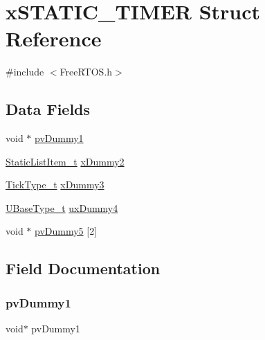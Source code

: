 \hypertarget{structx_s_t_a_t_i_c___t_i_m_e_r}{}\section{x\+S\+T\+A\+T\+I\+C\+\_\+\+T\+I\+M\+ER Struct Reference}
\label{structx_s_t_a_t_i_c___t_i_m_e_r}


{\ttfamily \#include $<$Free\+R\+T\+O\+S.\+h$>$}

\subsection*{Data Fields}
\begin{DoxyCompactItemize}
\item 
void $\ast$ \mbox{\hyperlink{structx_s_t_a_t_i_c___t_i_m_e_r_a6d34686c479f85ca81b1c8b8d63de30f}{pv\+Dummy1}}
\item 
\mbox{\hyperlink{_free_r_t_o_s_8h_a1d31bc0472385a87424518da484d9e09}{Static\+List\+Item\+\_\+t}} \mbox{\hyperlink{structx_s_t_a_t_i_c___t_i_m_e_r_af110422a11e634c23400ce5d10bd8b7f}{x\+Dummy2}}
\item 
\mbox{\hyperlink{portmacro_8h_aa69c48c6e902ce54f70886e6573c92a9}{Tick\+Type\+\_\+t}} \mbox{\hyperlink{structx_s_t_a_t_i_c___t_i_m_e_r_ac1b972afc468f0e753a25442242e6137}{x\+Dummy3}}
\item 
\mbox{\hyperlink{portmacro_8h_a646f89d4298e4f5afd522202b11cb2e6}{U\+Base\+Type\+\_\+t}} \mbox{\hyperlink{structx_s_t_a_t_i_c___t_i_m_e_r_a26be05b0990c51a2754226b559ab6550}{ux\+Dummy4}}
\item 
void $\ast$ \mbox{\hyperlink{structx_s_t_a_t_i_c___t_i_m_e_r_abae37cf280ed6295ec4169577ad19250}{pv\+Dummy5}} \mbox{[}2\mbox{]}
\end{DoxyCompactItemize}


\subsection{Field Documentation}
\mbox{\label{structx_s_t_a_t_i_c___t_i_m_e_r_a6d34686c479f85ca81b1c8b8d63de30f}} 
\subsubsection{\texorpdfstring{pvDummy1}{pvDummy1}}
{\footnotesize\ttfamily void$\ast$ pv\+Dummy1}


